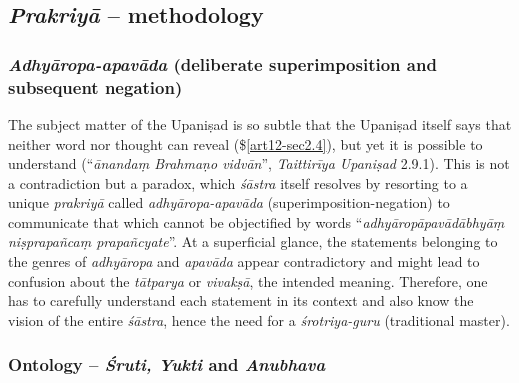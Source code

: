 \subsection{{{\sl\bfseries Prakriyā}\relax} -- methodology}\label{art12-sec2.5}

\subsubsection{{{\sl\bfseries Adhyāropa-apavāda}\relax} (deliberate superimposition and subsequent negation)}\label{art12-sec2.5.1}

The subject matter of the Upaniṣad is so subtle that the Upaniṣad itself says that neither word nor thought can reveal (\$\ref{art12-sec2.4}), but yet it is possible to understand (``{\sl ānandaṃ Brahmaṇo vidvān}'', {\sl Taittirīya Upaniṣad} 2.9.1). This is not a contradiction but a paradox, which {\sl śāstra} itself resolves by resorting to a unique {\sl prakriyā} called {\sl adhyāropa-apavāda} (superimposition-negation) to communicate that which cannot be objectiﬁed by words ``{\sl adhyāropāpavādābhyāṃ niṣprapañcaṃ prapañcyate}''. At a superﬁcial glance, the statements belonging to the genres of {\sl adhyāropa} and {\sl apavāda} appear contradictory and might lead to confusion about the {\sl tātparya} or {\sl vivakṣā}, the intended meaning. Therefore, one has to carefully understand each statement in its context and also know the vision of the entire {\sl śāstra}, hence the need for a {\sl śrotriya-guru} (traditional master).

\subsubsection{Ontology -- {{\sl\bfseries Śruti, Yukti}\relax} and {{\sl\bfseries Anubhava}\relax}}

